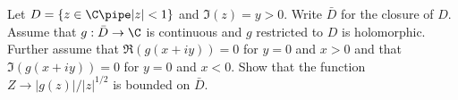 Let $D=\{z\in \C \pipe |z|<1\}$ and $\Im(z)=y>0$. Write $\bar{D}$ for the
closure of $D$. Assume that $g:\bar{D}\rightarrow \C$ is continuous
and $g$ restricted to $D$ is holomorphic. Further assume that
$\Re(g(x+iy))=0$ for $y=0$ and $x>0$ and that $\Im(g(x+iy))=0$ for $y=0$
and $x<0$. Show that the function $Z\rightarrow |g(z)|/|z|^{1/2}$ is
bounded on $\bar{D}$. 
